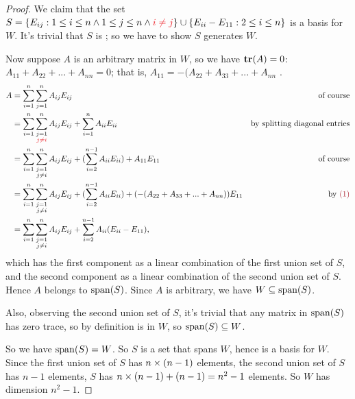 \begin{proof}
We claim that the set \(S = \{ E_{ij} : 1 \le i \le n \land 1 \le j \le n \land \RED{i \ne j} \} \cup \{ E_{ii} - E_{11} : 2 \le i \le n \}\) is a basis for \(W\).
It's trivial that \(S\) is \LID{};
so we have to show \(S\) generates \(W\).

Now suppose \(A\) is an arbitrary matrix in \(W\), so we have \(\textbf{tr}(A) = 0\): \(A_{11} + A_{22} + ... + A_{nn} = 0\);
that is, \(A_{11} = -(A_{22} + A_{33} + ... + A_{nn}\) .
\begin{align*}
    A & = \sum_{i = 1}^n \sum_{j = 1}^n A_{ij} E_{ij} & \text{of course} \\
      & = \sum_{i = 1}^n \sum_{\substack{j = 1 \\
                       \RED{j \ne i}}}^n A_{ij} E_{ij} + \sum_{i = 1}^n A_{ii} E_{ii} & \text{by splitting diagonal entries} \\
      & = \sum_{i = 1}^n \sum_{\substack{j = 1 \\
                       j \ne i}}^n A_{ij} E_{ij} + (\sum_{i = 2}^{n - 1} A_{ii} E_{ii}) + A_{11}E_{11} & \text{of course} \\
      & = \sum_{i = 1}^n \sum_{\substack{j = 1 \\
                       j \ne i}}^n A_{ij} E_{ij} + (\sum_{i = 2}^{n - 1} A_{ii} E_{ii}) + (-(A_{22} + A_{33} + ... + A_{nn}))E_{11} & \text{by \MAROON{(1)}} \\
      & = \sum_{i = 1}^n \sum_{\substack{j = 1 \\
                       j \ne i}}^n A_{ij} E_{ij} + \sum_{i = 2}^{n - 1} A_{ii} (E_{ii} - E_{11}),
\end{align*}
which has the first component as a linear combination of the first union set of \(S\), and the second component as a linear combination of the second union set of \(S\).
Hence \(A\) belongs to \(\operatorname{span}(S)\).
Since \(A\) is arbitrary, we have \(W \subseteq \operatorname{span}(S)\).

Also, observing the second union set of \(S\), it's trivial that any matrix in \(\operatorname{span}(S)\) has zero trace, so by definition is in \(W\), so \(\operatorname{span}(S) \subseteq W\).

So we have \(\operatorname{span}(S) = W\).
So \(S\) is a \LID{} set that spans \(W\), hence is a basis for \(W\).
Since the first union set of \(S\) has \(n \times (n - 1)\) elements, the second union set of \(S\) has \(n - 1\) elements, \(S\) has \(n \times (n - 1) + (n - 1) = n^2 - 1\) elements.
So \(W\) has dimension \(n^2 - 1\).
\end{proof}

